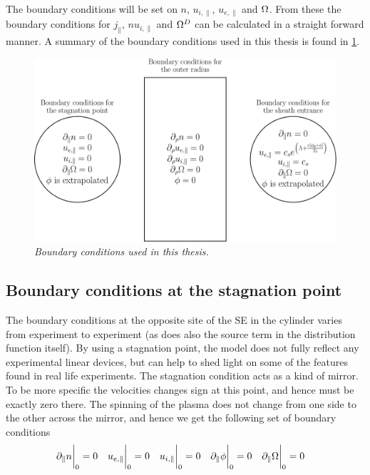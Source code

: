 The boundary conditions will be set on $n$, $u_{i,\|}$, $u_{e,\|}$ and $\Omega$.
From these the boundary conditions for $j_\|$, $nu_{i,\|}$ and $\Omega^D$ can be calculated in a straight forward manner.
A summary of the boundary conditions used in this thesis is found in \cref{fig:BCs}.
%
\begin{figure}[htb]
    \centering
    \includegraphics[width=1.0\textwidth]{fig/BCs}
    \caption{\textit{
Boundary conditions used in this thesis.
    }}
    \label{fig:BCs}
\end{figure}

\subsection{Boundary conditions at the stagnation point}
The boundary conditions at the opposite site of the SE in the cylinder varies from experiment to experiment (as does also the source term in the distribution function itself).
By using a stagnation point, the model does not fully reflect any experimental linear devices, but can help to shed light on some of the features found in real life experiments.
The stagnation condition acts as a kind of mirror.
To be more specific the velocities changes sign at this point, and hence must be exactly zero there.
The spinning of the plasma does not change from one side to the other across the mirror, and hence we get the following set of boundary conditions
%
\begin{align*}
    &\partial_\| n \bigg|_0    =0 &
    &u_{e,\|} \bigg|_0         =0 &
    &u_{i,\|} \bigg|_0         =0 &
    &\partial_\| \phi \bigg|_0 =0 &
    &\partial_\|\Omega \bigg|_0   =0 &
\end{align*}

